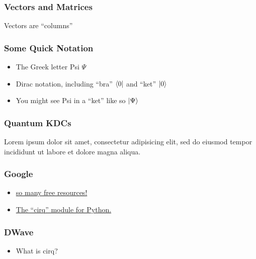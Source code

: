 \documentclass[aspectratio=169]{beamer} %
\begin{document}
\begin{frame}
	\frametitle{Vectors and Matrices}
    Vectors are ``columns''
\end{frame}

%
\begin{frame}
    \frametitle{}

\end{frame}

\begin{frame}
	\frametitle{Some Quick Notation}
    \begin{itemize}
	\item The Greek letter Psi \begin{math}\Psi\end{math}
    \item Dirac notation, including ``bra'' \begin{math}\bra{0}\end{math} and ``ket'' \begin{math}\ket{0}\end{math}
	\item You might see Psi in a ``ket'' like so \begin{math}\ket{\Psi}\end{math}
    \end{itemize}

\end{frame}

\begin{frame}{}
\frametitle{Quantum KDCs}
Lorem ipsum dolor sit amet, consectetur adipisicing elit, sed do eiusmod tempor incididunt ut labore et dolore magna aliqua.
\end{frame}

\begin{frame}{}
    \frametitle{Google}
     \begin{itemize}
         \item \href{https://quantumai.google/cirq/tutorials}{so many free resources!}
         \item \href{https://www.youtube.com/watch?v=16ZfkPRVf2w}{The ``cirq'' module for Python.}
     \end{itemize}
\end{frame}

\begin{frame}{}
    \frametitle{DWave}
    \begin{itemize}
        \item What is cirq?
    \end{itemize}
\end{frame}
\end{document}
